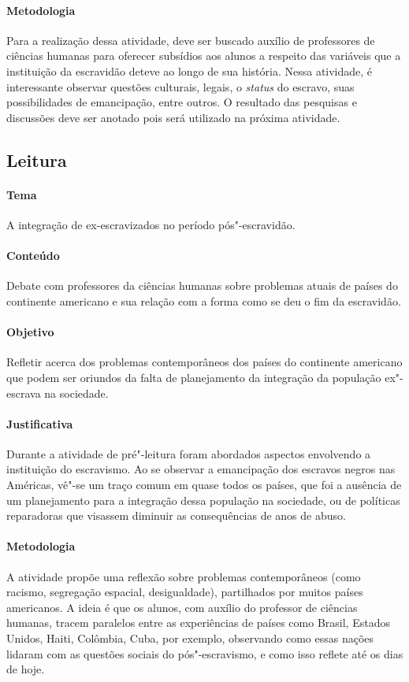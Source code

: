 \documentclass[12pt]{extarticle}
\begin{document}
\paragraph{Metodologia} Para a realização dessa atividade, deve ser buscado
auxílio de professores de ciências humanas para oferecer subsídios aos alunos a
respeito das variáveis que a instituição da escravidão deteve ao longo
de sua história. Nessa atividade, é interessante observar questões 
culturais, legais, o \emph{status} do escravo, suas possibilidades de
emancipação, entre outros. O resultado das pesquisas e discussões deve
ser anotado pois será utilizado na próxima atividade.


\subsection{Leitura}

\paragraph{Tema} A integração de ex-escravizados no período pós"-escravidão.

\paragraph{Conteúdo} Debate com professores da ciências humanas
sobre problemas atuais de países do continente americano e sua
relação com a forma como se deu o fim da escravidão.

\paragraph{Objetivo} Refletir acerca dos problemas contemporâneos dos países do 
continente americano que podem ser oriundos da falta de planejamento da 
integração da população ex"-escrava na sociedade.

\paragraph{Justificativa} Durante a atividade de pré"-leitura foram abordados aspectos
envolvendo a instituição do escravismo. Ao se observar a emancipação dos
escravos negros nas Américas, vê"-se um traço comum em quase todos os
países, que foi a ausência de um planejamento para a integração dessa
população na sociedade, ou de políticas reparadoras que visassem
diminuir as consequências de anos de abuso. 

\paragraph{Metodologia} A atividade propõe uma reflexão 
sobre problemas contemporâneos (como racismo,
segregação espacial, desigualdade), partilhados por muitos países
americanos. A ideia é que os alunos, com auxílio do professor de
ciências humanas, tracem paralelos entre as experiências de países como
Brasil, Estados Unidos, Haiti, Colômbia, Cuba, por exemplo, observando
como essas nações lidaram com as questões sociais do pós"-escravismo, e
como isso reflete até os dias de hoje.
\end{document}

